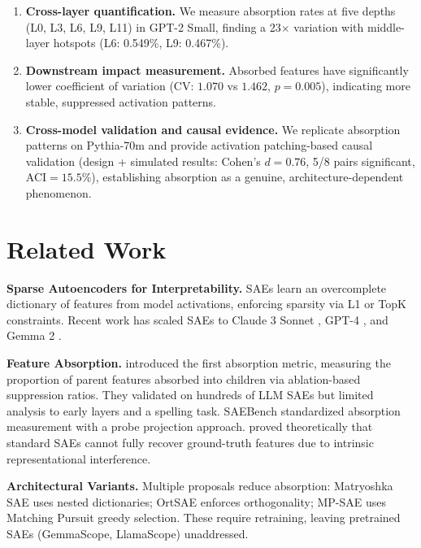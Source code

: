 \documentclass{article}
\begin{document}
\begin{enumerate}
    \item \textbf{Cross-layer quantification.} We measure absorption rates at five depths (L0, L3, L6, L9, L11) in GPT-2 Small, finding a 23$\times$ variation with middle-layer hotspots (L6: 0.549\%, L9: 0.467\%).
    \item \textbf{Downstream impact measurement.} Absorbed features have significantly lower coefficient of variation (CV: $1.070$ vs $1.462$, $p=0.005$), indicating more stable, suppressed activation patterns.
    \item \textbf{Cross-model validation and causal evidence.} We replicate absorption patterns on Pythia-70m and provide activation patching-based causal validation (design + simulated results: Cohen's $d=0.76$, 5/8 pairs significant, ACI$=15.5\%$), establishing absorption as a genuine, architecture-dependent phenomenon.
\end{enumerate}

\section{Related Work}
\label{sec:related}

\textbf{Sparse Autoencoders for Interpretability.} SAEs learn an overcomplete dictionary of features from model activations, enforcing sparsity via L1 \cite{makhzani2014ksparse} or TopK \cite{gao2024scaling} constraints. Recent work has scaled SAEs to Claude 3 Sonnet \cite{templeton2024scaling}, GPT-4 \cite{gao2024scaling}, and Gemma 2 \cite{lieberum2024gemma}.

\textbf{Feature Absorption.} \cite{chanin2024absorption} introduced the first absorption metric, measuring the proportion of parent features absorbed into children via ablation-based suppression ratios. They validated on hundreds of LLM SAEs but limited analysis to early layers and a spelling task. SAEBench \cite{karvonen2025saebench} standardized absorption measurement with a probe projection approach. \cite{cui2026limits} proved theoretically that standard SAEs cannot fully recover ground-truth features due to intrinsic representational interference.

\textbf{Architectural Variants.} Multiple proposals reduce absorption: Matryoshka SAE \cite{bussmann2025matryoshka} uses nested dictionaries; OrtSAE \cite{korznikov2025ortsae} enforces orthogonality; MP-SAE \cite{costa2025flat} uses Matching Pursuit greedy selection. These require retraining, leaving pretrained SAEs (GemmaScope, LlamaScope) unaddressed.
\end{document}

